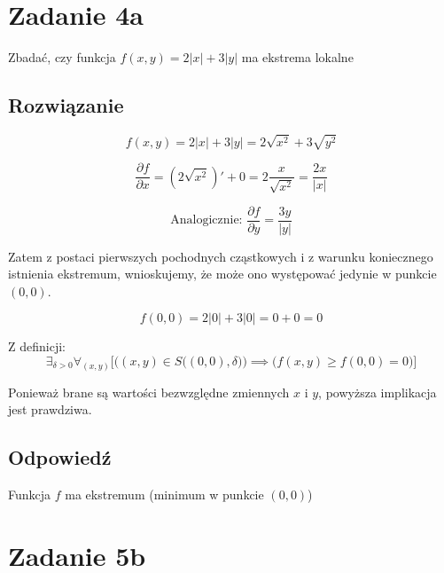 \documentclass{article}
\newcommand{\partderiv}[2]{\frac{\partial #1}{\partial #2}}
\DeclareMathOperator{\?}{?}
\begin{document}
\section*{Zadanie 4a}

Zbadać, czy funkcja $f(x,y) = 2|x| + 3|y|$ ma ekstrema lokalne

\subsection*{Rozwiązanie}

\begin{equation*}
   f(x,y) = 2|x| + 3|y| = 2\sqrt{x^2} + 3\sqrt{y^2}
\end{equation*}

\begin{equation*}
   \partderiv{f}{x} = \left(2\sqrt{x^2}\right)' + 0 = 2\frac{x}{\sqrt{x^2}} = \frac{2x}{|x|}
\end{equation*}

\begin{equation*}
   \textrm{Analogicznie: } \partderiv{f}{y} = \frac{3y}{|y|}
\end{equation*}

Zatem z postaci pierwszych pochodnych cząstkowych i z warunku koniecznego
istnienia ekstremum, wnioskujemy, że może ono występować jedynie w punkcie $(0,0)$.

\begin{equation*}
   f(0,0) = 2|0| + 3|0| = 0 + 0 = 0
\end{equation*}

Z definicji:
\begin{equation*}
   \exists_{\delta > 0} \forall_{(x,y)} \Bigg[
      \Big( (x,y) \in S\big((0,0), \delta \big) \Big) \implies \Big( f(x,y) \ge f(0,0) = 0 \Big)
      \Bigg]
\end{equation*}

Ponieważ brane są wartości bezwzględne zmiennych $x$ i $y$, powyższa implikacja
jest prawdziwa.

\subsection*{Odpowiedź}

Funkcja $f$ ma ekstremum \big(minimum w punkcie $(0,0)$\big)

\section*{Zadanie 5b}
\end{document}
